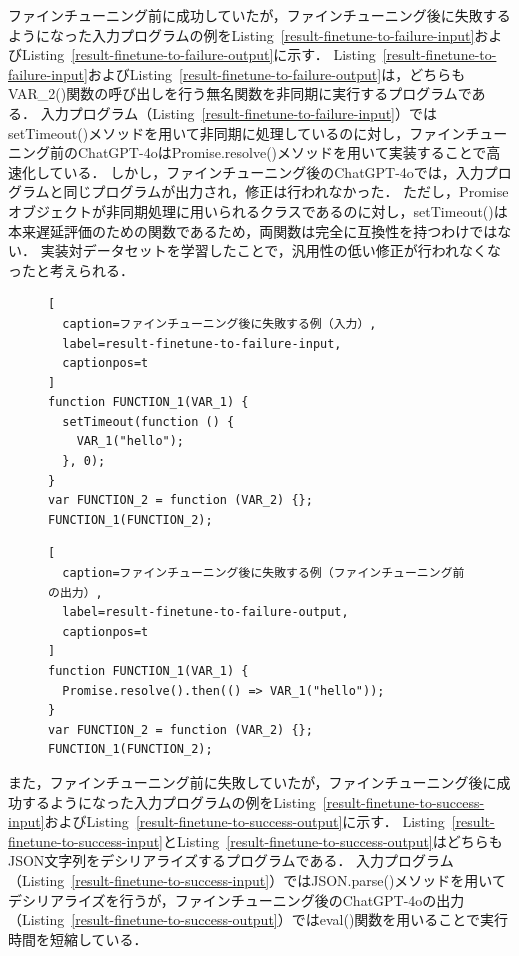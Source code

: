 \documentclass[11pt]{jreport}
\begin{document}
ファインチューニング前に成功していたが，ファインチューニング後に失敗するようになった入力プログラムの例をListing~\ref{result-finetune-to-failure-input}およびListing~\ref{result-finetune-to-failure-output}に示す．
Listing~\ref{result-finetune-to-failure-input}およびListing~\ref{result-finetune-to-failure-output}は，どちらもVAR\_2()関数の呼び出しを行う無名関数を非同期に実行するプログラムである．
入力プログラム（Listing~\ref{result-finetune-to-failure-input}）ではsetTimeout()メソッドを用いて非同期に処理しているのに対し，ファインチューニング前のChatGPT-4oはPromise.resolve()メソッドを用いて実装することで高速化している．
しかし，ファインチューニング後のChatGPT-4oでは，入力プログラムと同じプログラムが出力され，修正は行われなかった．
ただし，Promiseオブジェクトが非同期処理に用いられるクラスであるのに対し，setTimeout()は本来遅延評価のための関数であるため，両関数は完全に互換性を持つわけではない．
実装対データセットを学習したことで，汎用性の低い修正が行われなくなったと考えられる．


\begin{figure}[t]
\captionsetup{name=Listing}
\hspace{0.04\columnwidth}
\begin{minipage}[b]{0.96\linewidth}
\begin{lstlisting}[
  caption=ファインチューニング後に失敗する例（入力）,
  label=result-finetune-to-failure-input,
  captionpos=t
]
function FUNCTION_1(VAR_1) {
  setTimeout(function () {
    VAR_1("hello");
  }, 0);
}
var FUNCTION_2 = function (VAR_2) {};
FUNCTION_1(FUNCTION_2);
\end{lstlisting}
\end{minipage}

\hspace{0.04\columnwidth}
\begin{minipage}[b]{0.96\linewidth}
\begin{lstlisting}[
  caption=ファインチューニング後に失敗する例（ファインチューニング前の出力）,
  label=result-finetune-to-failure-output,
  captionpos=t
]
function FUNCTION_1(VAR_1) {
  Promise.resolve().then(() => VAR_1("hello"));
}
var FUNCTION_2 = function (VAR_2) {};
FUNCTION_1(FUNCTION_2);
\end{lstlisting}
\end{minipage}
\end{figure}


また，ファインチューニング前に失敗していたが，ファインチューニング後に成功するようになった入力プログラムの例をListing~\ref{result-finetune-to-success-input}およびListing~\ref{result-finetune-to-success-output}に示す．
Listing~\ref{result-finetune-to-success-input}とListing~\ref{result-finetune-to-success-output}はどちらもJSON文字列をデシリアライズするプログラムである．
入力プログラム（Listing~\ref{result-finetune-to-success-input}）ではJSON.parse()メソッドを用いてデシリアライズを行うが，ファインチューニング後のChatGPT-4oの出力（Listing~\ref{result-finetune-to-success-output}）ではeval()関数を用いることで実行時間を短縮している．
\end{document}
